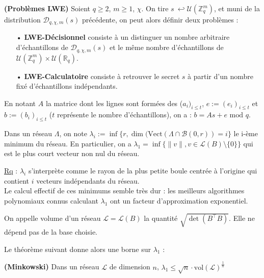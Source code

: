\documentclass[11pt,a4paper]{article}
\begin{document}
\begin{defin}\textbf{(Problèmes LWE)}
Soient $q\geq 2$, $m\geq 1$, $\chi$. On tire $s\ \hookleftarrow \mathcal{U}( \mathbb{Z}_q^m)$, et muni de la distribution $\mathcal{D}_{q,\chi,m}(s)$ précédente, on peut alors définir deux problèmes : 
\begin{enumerate}
\item[•]\textbf{LWE-Décisionnel} consiste à un distinguer un nombre arbitraire d'échantillons de $\mathcal{D}_{q,\chi,m}(s)$ et le même nombre d'échantillons de $\mathcal{U}(\mathbb{Z}_q^m)\times\mathcal{U}(\mathbb{R}_q)$.
\item[•]\textbf{LWE-Calculatoire} consiste à retrouver le secret $s$ à partir d'un nombre fixé d'échantillons indépendants.
\end{enumerate}
\end{defin}

En notant $A$ la matrice dont les lignes sont formées des ($a_i)_{i\leq t}$, $e:=(e_i)_{i\leq t}$ et $b:=(b_i)_{i\leq t}$ ($t$ représente le nombre d'échantillons), on a : $b=As +e \text{ mod } q$.

\begin{defin}
Dans un réseau $\Lambda$, on note $\lambda_i := \inf\{r,\dim(\text{Vect}(\Lambda\cap\mathcal{B}(0,r))=i\}$ le i-ème minimum du réseau. En particulier, on a $\lambda_1 = \inf\{\|v\| ,  v \in \mathcal{L}(B)\setminus\{0\}\}$ qui est le plus court vecteur non nul du réseau.
\end{defin}

\underline{Rq} : $\lambda_i$ s'interprète comme le rayon de la plus petite boule centrée à l'origine qui contient $i$ vecteurs indépendants du réseau. \\ Le calcul effectif de ces minimums semble très dur : les meilleurs algorithmes polynomiaux connus calculant $\lambda_1$ ont un facteur d'approximation exponentiel. \\

\begin{defin}
 On appelle volume d'un réseau $\mathcal{L}=\mathcal{L}(B)$ la quantité $\sqrt{\det{(B^\top B)}}$. Elle ne dépend pas de la base choisie.
\end{defin}

Le théorème suivant donne alors une borne sur $\lambda_1$ :
\begin{theorem}\textbf{(Minkowski)}
Dans un réseau $\mathcal{L}$ de dimension $n$, $\lambda_1 \leq \sqrt{n}\cdot\text{vol}(\mathcal{L})^\frac{1}{n}$
\end{theorem}
\end{document}
